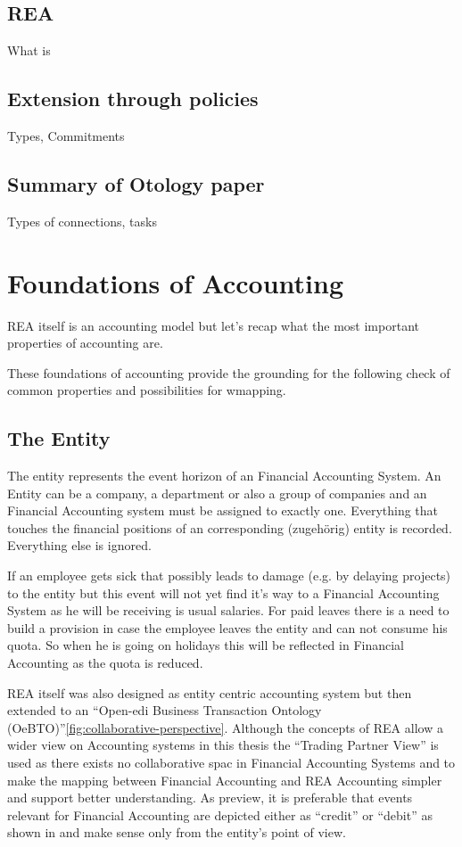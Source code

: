 \subsection{REA}
What is
\subsection{Extension through policies}
Types, Commitments
\subsection{Summary of Otology paper}
Types of connections, tasks
\section{Foundations of Accounting}
REA itself is an accounting model but let's recap what the most important
properties of accounting are. 

These foundations of accounting provide the grounding for the following check of common properties and possibilities for wmapping.

\subsection{The Entity}
The entity represents the event horizon of an Financial Accounting System.
An Entity can be a company, a department or also a group of companies and an Financial Accounting system must be assigned to exactly one.
Everything that touches the financial positions of an corresponding (zugehörig) entity is recorded.
Everything else is ignored.\cite[p.15]{horngren1984introduction}

If an employee gets sick that possibly leads to damage (e.g. by delaying projects) to the entity but this event will not yet find it's way to a Financial Accounting System as he will be receiving is usual salaries.
For paid leaves there is a need to build a provision in case the employee leaves the entity and can not consume his quota.
So when he is going on holidays this will be reflected in Financial Accounting as the quota is reduced.

REA itself was also designed as entity centric accounting system but then extended to an \enquote{Open-edi Business Transaction Ontology (OeBTO)}\cite[Figure 2]{ISOIEC1594442015}\ref{fig:collaborative-perspective}.
Although the concepts of REA allow a wider view on Accounting systems in this thesis the \enquote{Trading Partner View} is used as there exists no collaborative spac in Financial Accounting Systems and to make the mapping between Financial Accounting and REA Accounting simpler and support better understanding.
As preview, it is preferable that events relevant for Financial Accounting are depicted either as \enquote{credit} or \enquote{debit} as shown in \cite{schwaiger2015aleandrea} and make sense only from the entity's point of view.

